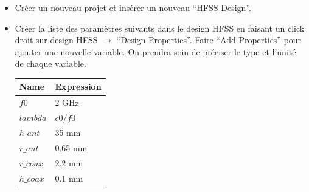 \begin{itemize}
    \item Créer un nouveau projet et insérer un nouveau ``HFSS Design''.

    \newpage
    \item Créer la liste des paramètres suivants dans le design HFSS en faisant un click droit sur design HFSS $\rightarrow$ ``Design Properties''. Faire ``Add Properties'' pour ajouter une nouvelle variable. On prendra soin de préciser le type et l'unité de chaque variable.

\begin{center}
\begin{tabular}{|l|l|}  %
\hline %
\textbf{Name} & \textbf{Expression} \\
\hline %
$f0$ & 2 GHz \\
\hline %
$lambda$ & $c0/f0$ \\
\hline %
$h\_ant$ & 35 mm \\
\hline %
$r\_ant$ & 0.65 mm \\
\hline %
$r\_coax$ & 2.2 mm \\
\hline %
$h\_coax$ & 0.1 mm \\
\hline %
\end{tabular}
\end{center}



\end{itemize}

